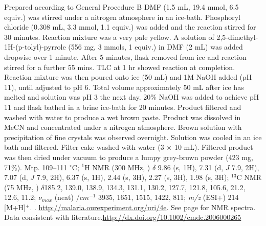 \documentclass[12pt, a4paper,titlepage]{article}
\begin{document}
Prepared according to General Procedure B
 DMF (1.5 mL, 19.4 mmol, 6.5 equiv.) was stirred under a nitrogen atmosphere in an ice-bath. Phosphoryl chloride (0.308 mL, 3.3 mmol, 1.1 equiv.) was added and the reaction stirred for 30 minutes. Reaction mixture was a very pale yellow. A solution of 2,5-dimethyl-1H-(p-tolyl)-pyrrole (556 mg, 3 mmols, 1 equiv.) in DMF (2 mL) was added dropwise over 1 minute. After 5 minutes, flask removed from ice and reaction stirred for a further 55 mins. TLC at 1 hr showed reaction at completion. Reaction mixture was then poured onto ice (50 mL) and 1M NaOH added (pH 11), until adjusted to pH 6. Total volume approximately 50 mL after ice has melted and solution was pH 3 the next day. 20\% NaOH was added to achieve pH 11 and flask bathed in a brine ice-bath for 20 minutes. Product filtered and washed with water to produce a wet brown paste. Product was dissolved in MeCN and concentrated under a nitrogen atmosphere. Brown solution with precipitation of fine crystals was observed overnight. Solution was cooled in an ice bath and filtered. Filter cake washed with water (3 $\times$ 10 mL). Filtered product was then dried under vacuum to produce a lumpy grey-brown powder (423 mg, 71\%).
Mtp. 109--111 $^\circ$C;
$^1$H NMR (300 MHz, ) $\delta$  9.86 (s, 1H), 7.31 (d, $J$ 7.9, 2H), 7.07 (d, $J$ 7.9, 2H), 6.37 (s, 1H), 2.44 (s, 3H), 2.27 (s, 3H), 1.98 (s, 3H); 
$^{13}$C NMR (75 MHz, ) $\delta$185.2, 139.0, 138.9, 134.3, 131.1, 130.2, 127.7, 121.8, 105.6, 21.2, 12.6, 11.2; 
 $\nu_{max}$ (neat) /$cm^{-1}$  3935, 1651, 1515, 1422, 811;
\emph{m/z} (ESI+) 214 [M+H]$^+$.
.
\url{http://malaria.ourexperiment.org/uri/4e}.
See page \pageref{spec:LMW5} for NMR spectra.
 Data consistent with literature.\url{http://dx.doi.org/10.1002/cmdc.2006000265}
\end{document}
